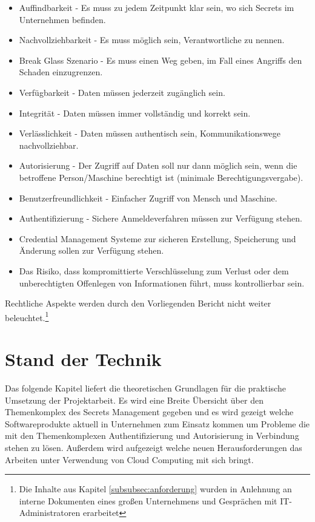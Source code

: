 \documentclass[
book,
a4paper,   
titlepage,  
halfparskip,
12pt        
]{scrartcl}
\begin{document}
\begin{onehalfspacing}
\begin{itemize}
  \item Auffindbarkeit - Es muss zu jedem Zeitpunkt klar sein, wo sich Secrets im Unternehmen befinden.
  \item Nachvollziehbarkeit - Es muss möglich sein, Verantwortliche zu nennen.
  \item Break Glass Szenario - Es muss einen Weg geben, im Fall eines Angriffs den Schaden einzugrenzen.
  \item Verfügbarkeit - Daten müssen jederzeit zugänglich sein.
  \item Integrität - Daten müssen immer vollständig und korrekt sein.
  \item Verlässlichkeit - Daten müssen authentisch sein, Kommunikationswege nachvollziehbar.
  \item Autorisierung - Der Zugriff auf Daten soll nur dann möglich sein, wenn die betroffene Person/Maschine berechtigt ist (minimale Berechtigungsvergabe).
  \item Benutzerfreundlichkeit - Einfacher Zugriff von Mensch und Maschine.
  \item Authentifizierung - Sichere Anmeldeverfahren müssen zur Verfügung stehen.
  \item Credential Management Systeme zur sicheren Erstellung, Speicherung und Änderung sollen zur Verfügung stehen.
  \item Das Risiko, dass kompromittierte Verschlüsselung zum Verlust oder dem unberechtigten Offenlegen von Informationen führt, muss kontrollierbar sein.
\end{itemize}

Rechtliche Aspekte werden durch den Vorliegenden Bericht nicht weiter beleuchtet.\footnote{Die Inhalte aus Kapitel \vref{subsubsec:anforderung} wurden in Anlehnung an interne Dokumenten eines großen Unternehmens und Gesprächen mit \ac{IT}-Administratoren erarbeitet}

\section{Stand der Technik}
Das folgende Kapitel liefert die theoretischen Grundlagen für die praktische Umsetzung der Projektarbeit. Es wird eine Breite Übersicht über den Themenkomplex des Secrets Management gegeben und es wird gezeigt welche Softwareprodukte aktuell in Unternehmen zum Einsatz kommen um Probleme die mit den Themenkomplexen Authentifizierung und Autorisierung in Verbindung stehen zu lösen. Außerdem wird aufgezeigt welche neuen Herausforderungen das Arbeiten unter Verwendung von Cloud Computing mit sich bringt. 


\end{onehalfspacing}
\end{document}
